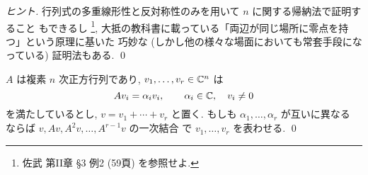 \documentclass[12pt,twoside]{jarticle}
\begin{document}
\begin{proof}[ヒント]
  行列式の多重線形性と反対称性のみを用いて $n$ に関する帰納法で証明すること
  もできるし%
  \footnote{佐武 \cite{satake} 第II章 \S 3 例2 (59頁) を参照せよ.}, 
  大抵の教科書に載っている「両辺が同じ場所に零点を持つ」という原理に基いた
  巧妙な (しかし他の様々な場面においても常套手段になっている) 証明法もある. 
  \qed
\end{proof}


\begin{question}
  \label{q:vandermonde-1}
  $A$ は複素 $n$ 次正方行列であり, $v_1,\ldots,v_r\in{\mathbb C}^n$ は
  \begin{equation*}
    A v_i = \alpha_i v_i, \qquad \alpha_i\in{\mathbb C},\quad v_i\ne 0
  \end{equation*}
  を満たしているとし, $v=v_1+\cdots+v_r$ と置く.
  もしも $\alpha_1,\ldots,\alpha_r$ が互いに異なる
  ならば  $v,Av,A^2v,\ldots,A^{r-1}v$ の一次結合
  で $v_1,\ldots,v_r$ を表わせる.
  \qed
\end{question}
\end{document}
